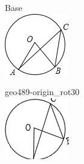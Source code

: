 \documentclass[12pt]{article}
\begin{document}
\begin{center}
\begin{minipage}{0.32\textwidth}\centering
Base\\
\includegraphics[width=0.95\linewidth]{out_rommath_origin/items/geo489-origin/assets/figure.png}
\end{minipage}
\hfill\begin{minipage}{0.32\textwidth}\centering
geo489-origin\_rot30\\
\includegraphics[width=0.95\linewidth]{out_rommath_origin/items/geo489-origin/assets/figure_rot30.png}

\end{minipage}
\end{center}
\end{document}
